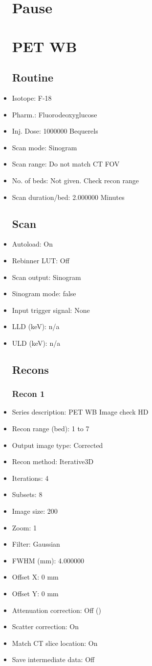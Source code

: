\documentclass[12pt]{article}
\begin{document}
\begin{itemize}[noitemsep]
\section{Pause}
\section{PET WB}\subsection{Routine}
\item Isotope: F-18
\item Pharm.: Fluorodeoxyglucose
\item Inj. Dose: 1000000 Bequerels
\item Scan mode: Sinogram
\item Scan range: Do not match CT FOV
\item No. of beds: Not given. Check recon range
\item Scan duration/bed: 2.000000 Minutes
\subsection{Scan}
\item Autoload: On
\item Rebinner LUT: Off
\item Scan output: Sinogram
\item Sinogram mode: false
\item Input trigger signal: None
\item LLD (keV): n/a
\item ULD (keV): n/a
\subsection{Recons}
\subsubsection{Recon 1}
\item Series description: PET WB Image check HD
\item Recon range (bed): 1 to 7
\item Output image type: Corrected
\item Recon method: Iterative3D
\item Iterations: 4
\item Subsets: 8
\item Image size: 200
\item Zoom: 1
\item Filter: Gaussian
\item FWHM (mm): 4.000000
\item Offset X: 0 mm
\item Offset Y: 0 mm
\item Attenuation correction: Off ()
\item Scatter correction: On
\item Match CT slice location: On
\item Save intermediate data: Off

\end{itemize}
\end{document}
